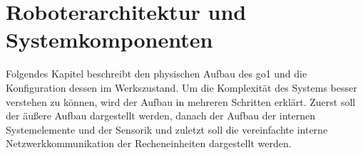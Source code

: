 \section{Roboterarchitektur und Systemkomponenten}
\label{sec:roboterarchitektur-und-systemkomponenten}

Folgendes Kapitel beschreibt den physischen Aufbau des \gls{go1} und die Konfiguration dessen im Werkszustand.
Um die Komplexität des Systems besser verstehen zu können, wird der Aufbau in mehreren Schritten erklärt.
Zuerst soll der äußere Aufbau dargestellt werden, danach der Aufbau der internen Systemelemente und der Sensorik und zuletzt
soll die vereinfachte interne Netzwerkkommunikation der Recheneinheiten dargestellt werden.




%

